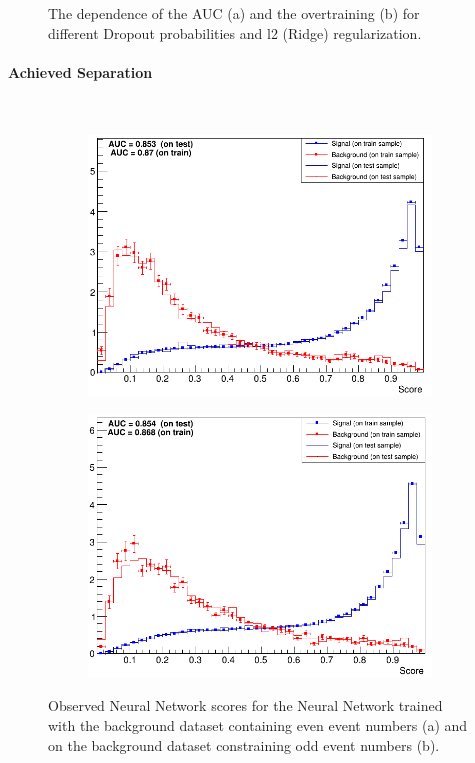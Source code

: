 \begin{figure}[H]
\begin{subfigure}{.5\textwidth}
  \caption{}
  \label{fig:ReguOv}
\end{subfigure}
\caption{The dependence of the AUC (a) and the overtraining (b) for different Dropout probabilities and l2 (Ridge) regularization.}
\label{fig:Regu}
\end{figure}


\paragraph{Achieved Separation} \mbox{} \\

\begin{figure}[H]
\begin{subfigure}{.5\textwidth}
  \centering
  \includegraphics[width=.99\linewidth]{figs/FNN/ScoreFNN19Even}
  \caption{}
  \label{fig:ScoreEven}
\end{subfigure}%
\begin{subfigure}{.5\textwidth}
  \centering
  \includegraphics[width=.99\linewidth]{figs/FNN/ScoreFNN19Odd}
  \caption{}
  \label{fig:ScoreOdd}
\end{subfigure}
\caption{Observed Neural Network scores for the Neural Network trained with the background dataset containing even event numbers (a) and on the background dataset constraining odd event numbers (b).}
\label{fig:Scores}
\end{figure}

